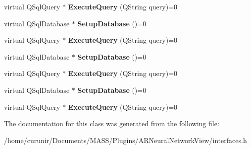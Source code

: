 \begin{DoxyCompactItemize}
\item 
virtual Q\+Sql\+Query $\ast$ {\bfseries Execute\+Query} (Q\+String query)=0\hypertarget{class_i_d_b_manager_plugin_acc0927a1751a2f1d0d87b9b324db17e7}{}\label{class_i_d_b_manager_plugin_acc0927a1751a2f1d0d87b9b324db17e7}

\item 
virtual Q\+Sql\+Database $\ast$ {\bfseries Setup\+Database} ()=0\hypertarget{class_i_d_b_manager_plugin_add096dcc73790ff4230a44816090d989}{}\label{class_i_d_b_manager_plugin_add096dcc73790ff4230a44816090d989}

\item 
virtual Q\+Sql\+Query $\ast$ {\bfseries Execute\+Query} (Q\+String query)=0\hypertarget{class_i_d_b_manager_plugin_acc0927a1751a2f1d0d87b9b324db17e7}{}\label{class_i_d_b_manager_plugin_acc0927a1751a2f1d0d87b9b324db17e7}

\item 
virtual Q\+Sql\+Database $\ast$ {\bfseries Setup\+Database} ()=0\hypertarget{class_i_d_b_manager_plugin_add096dcc73790ff4230a44816090d989}{}\label{class_i_d_b_manager_plugin_add096dcc73790ff4230a44816090d989}

\item 
virtual Q\+Sql\+Query $\ast$ {\bfseries Execute\+Query} (Q\+String query)=0\hypertarget{class_i_d_b_manager_plugin_acc0927a1751a2f1d0d87b9b324db17e7}{}\label{class_i_d_b_manager_plugin_acc0927a1751a2f1d0d87b9b324db17e7}

\item 
virtual Q\+Sql\+Database $\ast$ {\bfseries Setup\+Database} ()=0\hypertarget{class_i_d_b_manager_plugin_add096dcc73790ff4230a44816090d989}{}\label{class_i_d_b_manager_plugin_add096dcc73790ff4230a44816090d989}

\item 
virtual Q\+Sql\+Query $\ast$ {\bfseries Execute\+Query} (Q\+String query)=0\hypertarget{class_i_d_b_manager_plugin_acc0927a1751a2f1d0d87b9b324db17e7}{}\label{class_i_d_b_manager_plugin_acc0927a1751a2f1d0d87b9b324db17e7}

\end{DoxyCompactItemize}


The documentation for this class was generated from the following file\+:\begin{DoxyCompactItemize}
\item 
/home/curunir/\+Documents/\+M\+A\+S\+S/\+Plugins/\+A\+R\+Neural\+Network\+View/interfaces.\+h\end{DoxyCompactItemize}
